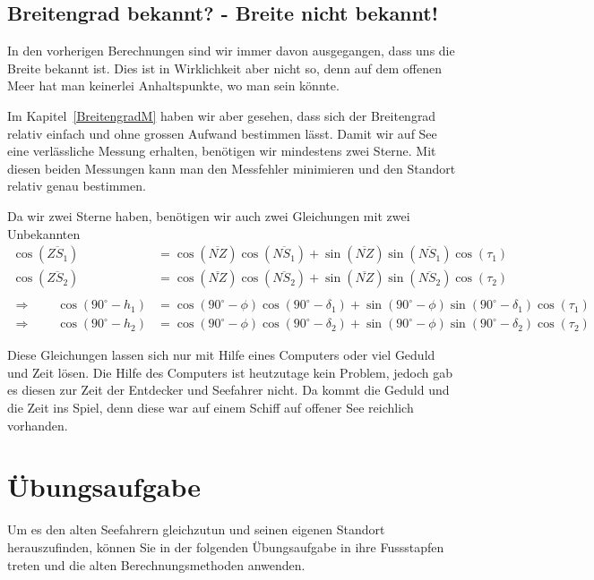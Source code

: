 \begin{refsection}
\subsection{Breitengrad bekannt? - Breite nicht bekannt!}

In den vorherigen Berechnungen sind wir immer davon ausgegangen, dass uns die Breite bekannt ist. Dies ist in Wirklichkeit aber nicht so, denn auf dem offenen Meer hat man keinerlei Anhaltspunkte, wo man sein könnte.

Im Kapitel~\ref{BreitengradM}  haben wir aber gesehen, dass sich der Breitengrad relativ einfach und ohne grossen Aufwand bestimmen lässt. Damit wir auf See eine verlässliche Messung erhalten, benötigen wir mindestens zwei Sterne. Mit diesen beiden Messungen kann man den Messfehler minimieren und den Standort relativ genau bestimmen.

Da wir zwei Sterne haben, benötigen wir auch zwei Gleichungen mit zwei Unbekannten
\begin{align*}
\cos(\overline{ZS_1}) &= \cos(\overline{NZ}) \cos(\overline{NS_1}) + \sin(\overline{NZ}) \sin(\overline{NS_1}) \cos(\tau_1) \\
\cos(\overline{ZS_2}) &= \cos(\overline{NZ}) \cos(\overline{NS_2}) + \sin(\overline{NZ}) \sin(\overline{NS_2}) \cos(\tau_2) \\
\\
\Rightarrow \quad \quad
\cos(90^{\circ} - h_1) &= \cos(90^{\circ} - \phi) \cos(90^{\circ} - \delta_1) + \sin(90^{\circ} - \phi)\sin(90^{\circ} - \delta_1) \cos(\tau_1) \\
\Rightarrow \quad \quad
\cos(90^{\circ} - h_2) &= \cos(90^{\circ} - \phi) \cos(90^{\circ} - \delta_2) + \sin(90^{\circ} - \phi)\sin(90^{\circ} - \delta_2) \cos(\tau_2)
\end{align*}

Diese Gleichungen lassen sich nur mit Hilfe eines Computers oder viel Geduld und Zeit lösen. Die Hilfe des Computers ist heutzutage kein Problem, jedoch gab es diesen zur Zeit der Entdecker und Seefahrer nicht. Da kommt die Geduld und die Zeit ins Spiel, denn diese war auf einem Schiff auf offener See reichlich vorhanden.


\section{Übungsaufgabe}
Um es den alten Seefahrern gleichzutun und seinen eigenen Standort herauszufinden, können Sie in der folgenden Übungsaufgabe in ihre Fussstapfen treten und die alten Berechnungsmethoden anwenden. \\


\end{refsection}
